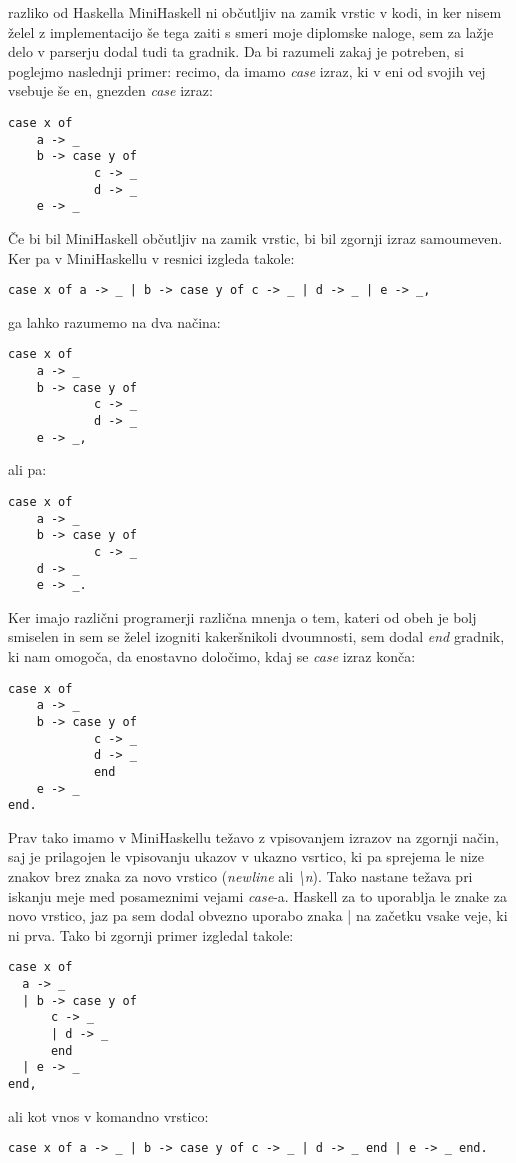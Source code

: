\documentclass[12pt,a4paper,openany]{book}
\begin{document}
razliko od Haskella MiniHaskell ni občutljiv na zamik vrstic v kodi, in ker nisem želel z implementacijo še tega zaiti s smeri moje diplomske naloge, sem za lažje delo v parserju 
dodal tudi ta gradnik. Da bi razumeli zakaj je potreben, si poglejmo naslednji primer: recimo, da imamo \emph{case} izraz, ki v eni od svojih vej vsebuje še en, gnezden \emph{case} 
izraz:
\begin{lstlisting}
case x of 
    a -> _
    b -> case y of
            c -> _
            d -> _
    e -> _
\end{lstlisting}
Če bi bil MiniHaskell občutljiv na zamik vrstic, bi bil zgornji izraz samoumeven. Ker pa v MiniHaskellu v resnici izgleda takole:
\begin{lstlisting}
case x of a -> _ | b -> case y of c -> _ | d -> _ | e -> _,
\end{lstlisting}
ga lahko razumemo na dva načina:
\begin{lstlisting}
case x of 
    a -> _
    b -> case y of
            c -> _
            d -> _
    e -> _,
\end{lstlisting}
ali pa:
\begin{lstlisting}
case x of 
    a -> _
    b -> case y of
            c -> _
    d -> _
    e -> _.
\end{lstlisting}
Ker imajo različni programerji različna mnenja o tem, kateri od obeh je bolj smiselen in sem se želel izogniti kakeršnikoli dvoumnosti, sem dodal 
\emph{end} gradnik, ki nam omogoča, da enostavno določimo, kdaj se \emph{case} izraz konča:
\begin{lstlisting}
case x of 
    a -> _
    b -> case y of
            c -> _
            d -> _
            end
    e -> _
end.
\end{lstlisting}
Prav tako imamo v MiniHaskellu težavo z vpisovanjem izrazov na zgornji način, saj je prilagojen le vpisovanju ukazov v ukazno vsrtico, ki pa 
sprejema le nize znakov brez znaka za novo vrstico (\emph{newline} ali \emph{\textbackslash n}). Tako nastane težava pri iskanju meje med posameznimi vejami
\emph{case}-a. Haskell za to uporablja le znake za novo vrstico, jaz pa sem dodal obvezno uporabo znaka | na začetku vsake veje, ki ni prva.
Tako bi zgornji primer izgledal takole:
\begin{lstlisting}
case x of 
  a -> _
  | b -> case y of
      c -> _
      | d -> _
      end
  | e -> _
end,
\end{lstlisting}
ali kot vnos v komandno vrstico:
\begin{lstlisting}
case x of a -> _ | b -> case y of c -> _ | d -> _ end | e -> _ end.
\end{lstlisting}
\end{document}
